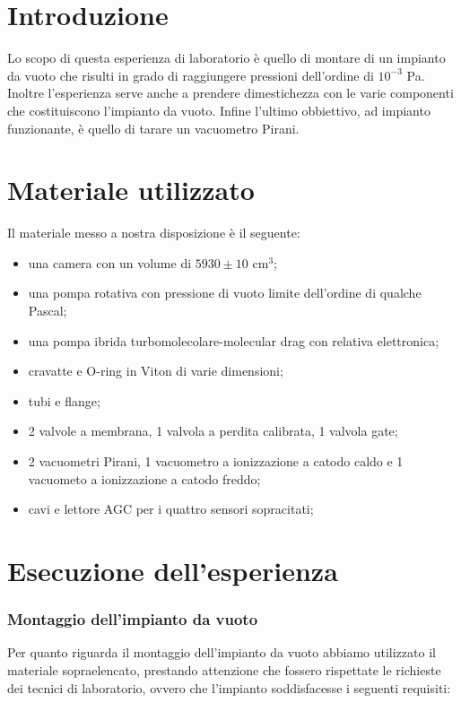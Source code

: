\section{Introduzione}

Lo scopo di questa esperienza di laboratorio è quello di montare di un impianto da vuoto che risulti in
grado di raggiungere pressioni dell'ordine di $10^{-3}$ \si{\pascal}. Inoltre l'esperienza serve anche a
prendere dimestichezza con le varie componenti che costituiscono l'impianto da vuoto.
Infine l'ultimo obbiettivo, ad impianto funzionante, è quello di tarare un vacuometro Pirani.

\section{Materiale utilizzato}

Il materiale messo a nostra disposizione è il seguente:

\begin{itemize}
	\item{una camera con un volume di $5930 \pm 10$ \si{\centi\metre}$^3$;}
	\item{una pompa rotativa con pressione di vuoto limite dell'ordine di qualche Pascal;}
	\item{una pompa ibrida turbomolecolare-molecular drag con relativa elettronica;}
	\item{cravatte e O-ring in Viton di varie dimensioni;}
	\item{tubi e flange;} %
	\item{2 valvole a membrana, 1 valvola a perdita calibrata, 1 valvola gate;}
	\item{2 vacuometri Pirani, 1 vacuometro a ionizzazione a catodo caldo e 1 vacuometo a ionizzazione a catodo freddo;}
	\item{cavi e lettore AGC per i quattro sensori sopracitati;}
\end{itemize}

\section{Esecuzione dell'esperienza}

\subsubsection{Montaggio dell'impianto da vuoto}

Per quanto riguarda il montaggio dell'impianto da vuoto abbiamo utilizzato il materiale sopraelencato,
prestando attenzione che fossero rispettate le richieste dei tecnici di laboratorio,
ovvero che l'impianto soddisfacesse i seguenti requisiti:

